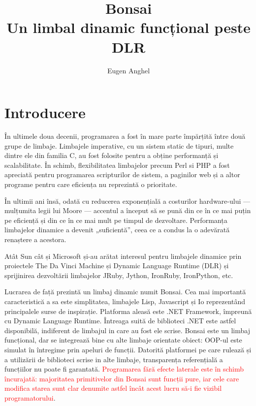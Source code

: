 \documentclass[12pt,a4paper]{memoir}
\title{Bonsai\\Un limbal dinamic funcțional peste DLR}
\author{Eugen Anghel}
\begin{document}
\newcommand{\draft}{\textcolor{red}}

\maketitle

\newpage
\tableofcontents

\chapter{Introducere}

În ultimele doua decenii, programarea a fost în mare parte împărțită între două grupe de limbaje. Limbajele imperative, cu un sistem static de tipuri, multe dintre ele din familia C, au fost folosite pentru a obține performanță și scalabilitate. În schimb, flexibilitatea limbajelor precum Perl si PHP a fost apreciată pentru programarea scripturilor de sistem, a paginilor web și a altor programe pentru care eficiența nu reprezintă o prioritate.

În ultimii ani însă, odată cu reducerea exponențială a costurilor hardware-ului — mulțumita legii lui Moore — accentul a început să se pună din ce în ce mai puțin pe eficiență și din ce în ce mai mult pe timpul de dezvoltare. Performanța limbajelor dinamice a devenit „suficientă”, ceea ce a condus la o adevărată renaștere a acestora.

Atât Sun cât și Microsoft și-au arătat interesul pentru limbajele dinamice prin proiectele The Da Vinci Machine\cite{daVinciMachine} și Dynamic Language Runtime (DLR)\cite{dlr} și sprijinirea dezvoltării limbajelor JRuby\cite{jruby}, Jython\cite{jython}, IronRuby\cite{ironruby}, IronPython\cite{ironpython}, etc.

Lucrarea de față prezintă un limbaj dinamic numit Bonsai. Cea mai importantă caracteristică a sa este simplitatea, limbajele Lisp, Javascript și Io \cite{io} reprezentând principalele surse de inspirație. Platforma aleasă este .NET Framework, împreună cu Dynamic Language Runtime. Întreaga suită de biblioteci .NET este astfel disponibilă, indiferent de limbajul in care au fost ele scrise. Bonsai este un limbaj funcțional, dar se integrează bine cu alte limbaje orientate obiect: OOP-ul este simulat în întregime prin apeluri de funcții. Datorită platformei pe care rulează și a utilizării de biblioteci scrise in alte limbaje, transparența referențială a funcțiilor nu poate fi garantată.
\draft{Programarea fără efecte laterale este în schimb încurajată: majoritatea primitivelor din Bonsai sunt funcții pure, iar cele care modifica starea sunt clar denumite astfel încât acest lucru să-i fie vizibil programatorului}.
\end{document}

